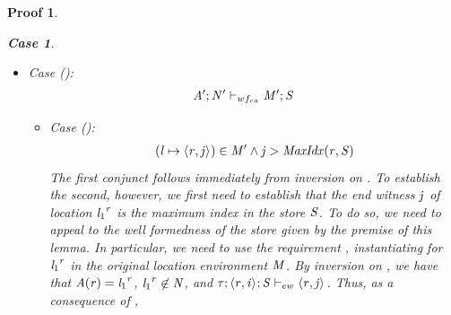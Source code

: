 \documentclass[showabstract,showacknowledgments,showpreface,showdedication]{iuphd}
\newtheorem*{bcase}{Case}
\theoremstyle{nonumberplain}
\newtheorem{nproof}{Proof}
\begin{document}
\begin{nproof}
\begin{bcase}
\begin{itemize}
\begin{itemize}
      not satisfied immediately by the well formedness of the store
      given in the premise of the lemma is requirement
      The specific requirement is to establish that
      \begin{align*}
       (\locreg{\loc_1}{\reg} \mapsto \concreteloc{\reg}{\ind}{}) \in \MENV' \wedge \\
       \ewitness{\TYP}{\concreteloc{\reg}{\ind}{}}{\STOR}{\concreteloc{\reg}{\indj}{}} \wedge \\
       (\loc \mapsto \concreteloc{\reg}{\indj}{}) \in \MENV'
      \end{align*}
      which follows immediately by inversion on \dletlocafter{}.
      \item Case ():
      \begin{align*}
      \mathit{A}';\mathit{N}' \vdash_{wf_{ca}} \mathit{M}';\mathit{S}
      \end{align*}
        \begin{itemize}
        \item Case ():
        \begin{align*}
                  (\mathit{l} \mapsto \langle \mathit{r}, \mathit{j} \rangle ^{}) \in \mathit{M}' \wedge
          \mathit{j} > \mathit{MaxIdx}(\mathit{r},\mathit{S})
        \end{align*}
        The first conjunct follows immediately from inversion on \dletlocafter{}.
        To establish the second, however, we first need to establish
        that the end witness $\mathit{j}$ of location ${\mathit{l}_1}^{\mathit{r}}$ is the maximum index in the
        store $\mathit{S}$.
        To do so, we need to appeal to the well formedness of the store given by the
        premise of this lemma.
        In particular, we need to use the requirement , 
        instantiating for ${\mathit{l}_1}^{\mathit{r}}$ in the original location environment $\mathit{M}$.
        By inversion on \tllafter{}, we have that $\mathit{A}(\mathit{r}) = {\mathit{l}_1}^{\mathit{r}}$, ${\mathit{l}_1}^{\mathit{r}} \not \in \mathit{N}$,
        and $\mathit{\tau};\langle \mathit{r}, \mathit{i} \rangle ^{};\mathit{S} \vdash_{ew} \langle \mathit{r}, \mathit{j} \rangle ^{}$.
        Thus, as a consequence of ,

\end{itemize}
\end{itemize}
\end{itemize}
\end{bcase}
\end{nproof}
\end{document}
